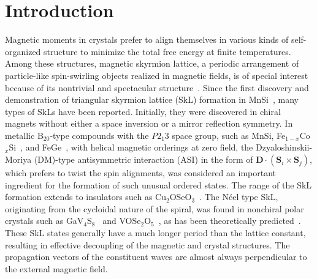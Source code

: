 \documentclass[aps,prb,reprint,superscriptaddress,amsmath,amssymb]{revtex4-2}
\begin{document}
\section{Introduction}
Magnetic moments in crystals prefer to align themselves in various kinds of self-organized structure to minimize the total free energy at finite temperatures. 
Among these structures, magnetic skyrmion lattice, a periodic arrangement of particle-like spin-swirling objects realized in magnetic fields, is of special interest because of its nontrivial and spectacular structure~\cite{Nagaosa13,Tokura21}. 
Since the first discovery and demonstration of triangular skyrmion lattice (SkL) formation in MnSi~\cite{Muhlbauer09}, many types of SkLs have been reported.  Initially, they were discovered in chiral magnets without either a space inversion or a mirror reflection symmetry. 
In metallic B$_{20}$-type compounds with the $P2_{1}3$ space group, such as MnSi, Fe$_{1-x}$Co$_x$Si~\cite{Yu10,Munzer10}, and FeGe~\cite{Yamasaki15,McGrouther16}, with helical magnetic orderings at zero field, the Dzyaloshinskii-Moriya (DM)-type antisymmetric  interaction (ASI) in the form of $\bm{D}\cdot(\bm{S}_i \times \bm{S}_j)$, which prefers to twist the spin alignments, was considered an important ingredient for the formation of such unusual ordered states. 
The range of the SkL formation extends to insulators such as Cu$_2$OSeO$_3$~\cite{Seki12,Adams12}. 
The N\'{e}el type SkL, originating from the cycloidal nature of the spiral, was found in nonchiral polar crystals such as GaV$_4$S$_8$~\cite{Kezsmarki15} and VOSe$_2$O$_5$~\cite{Kurumaji17,Kurumaji21}, as has been theoretically predicted~\cite{Bogdanov89,Bogdanov94}. 
These SkL states generally have a much longer period than the lattice constant, resulting in effective decoupling of the magnetic and crystal structures. 
The propagation vectors of the constituent waves are almost always perpendicular to the external magnetic field. 
\end{document}
